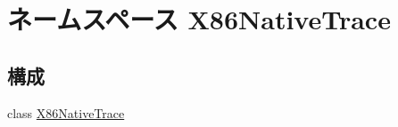 \hypertarget{namespaceX86NativeTrace}{
\section{ネームスペース X86NativeTrace}
\label{namespaceX86NativeTrace}
}
\subsection*{構成}
\begin{DoxyCompactItemize}
\item 
class \hyperlink{classX86NativeTrace_1_1X86NativeTrace}{X86NativeTrace}
\end{DoxyCompactItemize}
